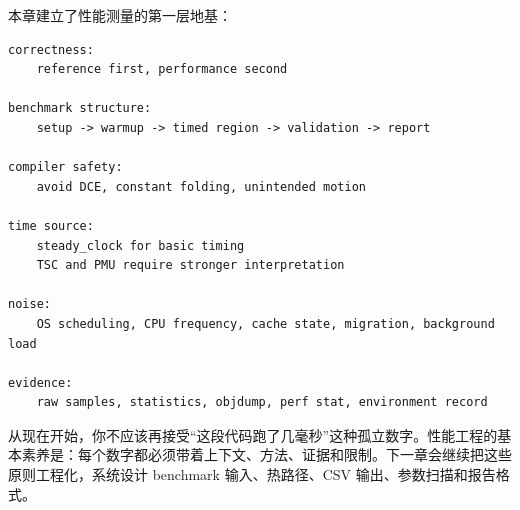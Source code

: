 本章建立了性能测量的第一层地基：

\begin{lstlisting}
correctness:
    reference first, performance second

benchmark structure:
    setup -> warmup -> timed region -> validation -> report

compiler safety:
    avoid DCE, constant folding, unintended motion

time source:
    steady_clock for basic timing
    TSC and PMU require stronger interpretation

noise:
    OS scheduling, CPU frequency, cache state, migration, background load

evidence:
    raw samples, statistics, objdump, perf stat, environment record
\end{lstlisting}

从现在开始，你不应该再接受“这段代码跑了几毫秒”这种孤立数字。性能工程的基本素养是：每个数字都必须带着上下文、方法、证据和限制。下一章会继续把这些原则工程化，系统设计 benchmark 输入、热路径、CSV 输出、参数扫描和报告格式。
